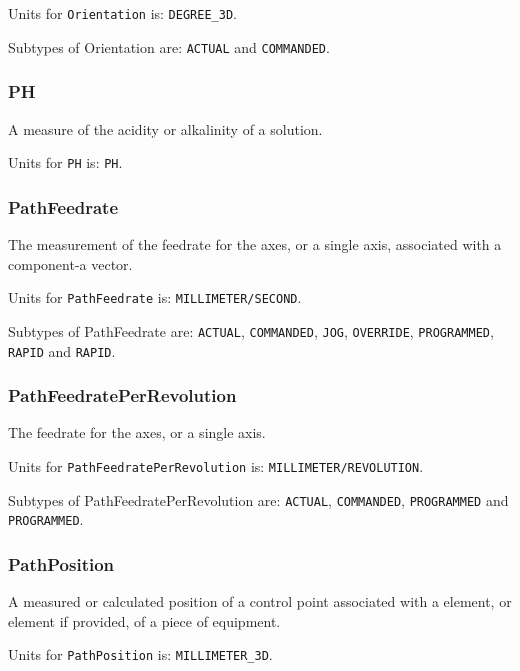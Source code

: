 Units for \texttt{Orientation} is: \texttt{DEGREE_3D}.


Subtypes of Orientation are: \texttt{ACTUAL} and \texttt{COMMANDED}. 
\FloatBarrier

\subsubsection{PH}
  \label{sec:PH}


A measure of the acidity or alkalinity of a solution.


Units for \texttt{PH} is: \texttt{PH}.

\FloatBarrier

\subsubsection{PathFeedrate}
  \label{sec:PathFeedrate}


The measurement of the feedrate for the axes, or a single axis, associated with a  component-a vector.


Units for \texttt{PathFeedrate} is: \texttt{MILLIMETER/SECOND}.


Subtypes of PathFeedrate are: \texttt{ACTUAL}, \texttt{COMMANDED}, \texttt{JOG}, \texttt{OVERRIDE}, \texttt{PROGRAMMED}, \texttt{RAPID} and \texttt{RAPID}. 
\FloatBarrier

\subsubsection{PathFeedratePerRevolution}
  \label{sec:PathFeedratePerRevolution}


The feedrate for the axes, or a single axis.


Units for \texttt{PathFeedratePerRevolution} is: \texttt{MILLIMETER/REVOLUTION}.


Subtypes of PathFeedratePerRevolution are: \texttt{ACTUAL}, \texttt{COMMANDED}, \texttt{PROGRAMMED} and \texttt{PROGRAMMED}. 
\FloatBarrier

\subsubsection{PathPosition}
  \label{sec:PathPosition}


A measured or calculated position of a control point associated with a  element, or  element if provided, of a piece of equipment.


Units for \texttt{PathPosition} is: \texttt{MILLIMETER_3D}.


